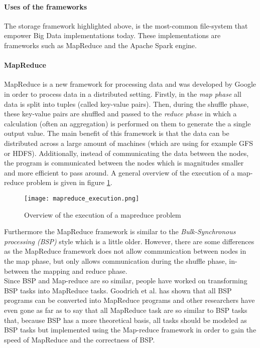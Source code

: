\paragraph{Uses of the frameworks}
The storage framework highlighted above, is the most-common file-system that empower Big Data implementations today. These implementations are frameworks such as MapReduce and the Apache Spark engine.

\paragraph{MapReduce}
MapReduce is a new framework for processing data and was developed by Google\cite{Dean04} in order to process data in a distributed setting. Firstly, in the \textit{map phase} all data is split into tuples (called key-value pairs). Then, during the shuffle phase, these key-value pairs are shuffled and passed to the \textit{reduce phase} in which a calculation (often an aggregation) is performed on them to generate the a single output value. The main benefit of this framework is that the data can be distributed across a large amount of machines (which are using for example GFS or HDFS). Additionally, instead of communicating the data between the nodes, the program is communicated between the nodes which is magnitudes smaller and more efficient to pass around. A general overview of the execution of a map-reduce problem is given in figure \ref{mapreduce_execution}.

\begin{figure}
	\texttt{[image: mapreduce\_execution.png]}
	\caption{Overview of the execution of a mapreduce problem\cite{Dean04}}
	\label{mapreduce_execution}
\end{figure}

Furthermore the MapReduce framework is similar to the \textit{Bulk-Synchronous processing (BSP)} style which is a little older. However, there are some differences as the MapReduce framework does not allow communication between nodes in the map phase, but only allows communication during the shuffle phase, in-between the mapping and reduce phase\cite{Pace12}.\\
Since BSP and Map-reduce are so similar, people have worked on transforming BSP tasks into MapReduce tasks. Goodrich et al.\cite{Goo11} has shown that all BSP programs can be converted into MapReduce programs and other researchers have even gone as far as to say that all MapReduce task are so similar to BSP tasks that, because BSP has a more theoretical basis, all tasks should be modeled as BSP tasks but implemented using the Map-reduce framework in order to gain the speed of MapReduce and the correctness of BSP\cite{Pace12}.

